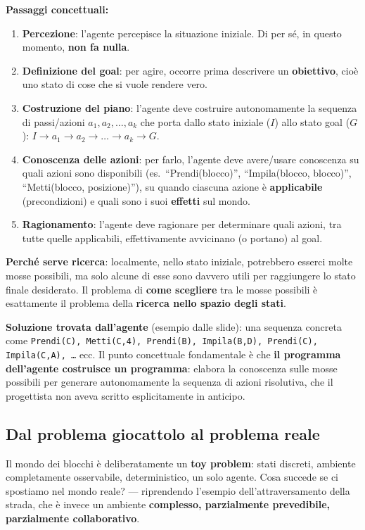 \documentclass[11pt,a4paper]{report}
\begin{document}
\textbf{Passaggi concettuali:}
\begin{enumerate}
  \item \textbf{Percezione}: l'agente percepisce la situazione iniziale. Di per sé, in questo momento, \textbf{non fa nulla}.
  \item \textbf{Definizione del goal}: per agire, occorre prima descrivere un \textbf{obiettivo}, cioè uno stato di cose che si vuole rendere vero.
  \item \textbf{Costruzione del piano}: l'agente deve costruire autonomamente la sequenza di passi/azioni $a_1, a_2, \dots, a_k$ che porta dallo stato iniziale ($I$) allo stato goal ($G$): $I \to a_1 \to a_2 \to \dots \to a_k \to G$.
  \item \textbf{Conoscenza delle azioni}: per farlo, l'agente deve avere/usare conoscenza su quali azioni sono disponibili (es.\ ``Prendi(blocco)'', ``Impila(blocco, blocco)'', ``Metti(blocco, posizione)''), su quando ciascuna azione è \textbf{applicabile} (precondizioni) e quali sono i suoi \textbf{effetti} sul mondo.
  \item \textbf{Ragionamento}: l'agente deve ragionare per determinare quali azioni, tra tutte quelle applicabili, effettivamente avvicinano (o portano) al goal.
\end{enumerate}

\textbf{Perché serve ricerca}: localmente, nello stato iniziale, potrebbero esserci molte mosse possibili, ma solo alcune di esse sono davvero utili per raggiungere lo stato finale desiderato. Il problema di \textbf{come scegliere} tra le mosse possibili è esattamente il problema della \textbf{ricerca nello spazio degli stati}.

\textbf{Soluzione trovata dall'agente} (esempio dalle slide): una sequenza concreta come \texttt{Prendi(C), Metti(C,4), Prendi(B), Impila(B,D), Prendi(C), Impila(C,A), \dots} ecc. Il punto concettuale fondamentale è che \textbf{il programma dell'agente costruisce un programma}: elabora la conoscenza sulle mosse possibili per generare autonomamente la sequenza di azioni risolutiva, che il progettista non aveva scritto esplicitamente in anticipo.

\subsection{Dal problema giocattolo al problema reale}

Il mondo dei blocchi è deliberatamente un \textbf{toy problem}: stati discreti, ambiente completamente osservabile, deterministico, un solo agente. Cosa succede se ci spostiamo nel mondo reale? --- riprendendo l'esempio dell'attraversamento della strada, che è invece un ambiente \textbf{complesso, parzialmente prevedibile, parzialmente collaborativo}.
\end{document}
